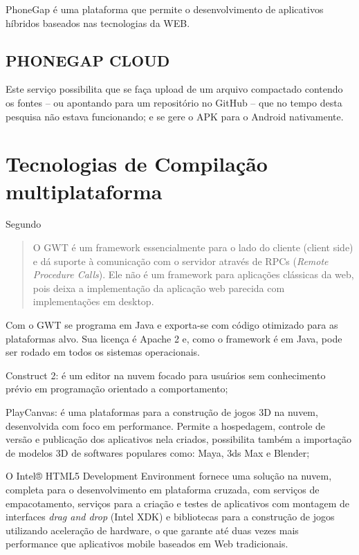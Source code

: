 PhoneGap é uma plataforma que permite o desenvolvimento de aplicativos híbridos baseados nas tecnologias da WEB.

\section{PHONEGAP CLOUD}

Este serviço possibilita que se faça upload de um arquivo compactado
contendo os fontes – ou apontando para um repositório no GitHub –
que no tempo desta pesquisa não estava funcionando; e se gere o APK
para o Android nativamente.

\chapter{Tecnologias de Compilação multiplataforma}

Segundo \cite[pp. 29]{gtw}
\begin{quote}
O GWT é um framework essencialmente para o lado do cliente (client
side) e dá suporte à comunicação com o servidor através de RPCs
(\textit{Remote Procedure Calls}). Ele não é um framework para
aplicações clássicas da web, pois deixa a implementação da
aplicação web parecida com implementações em desktop.
\end{quote}

Com o GWT se programa em Java e exporta-se com código otimizado para
as plataformas alvo. Sua licença é Apache 2 e, como o framework é em Java,
pode ser rodado em todos os sistemas operacionais.

Construct 2: é um editor na nuvem focado para usuários sem
conhecimento prévio em programação orientado a comportamento;

PlayCanvas: é uma plataformas para a construção de jogos 3D
na nuvem, desenvolvida com foco em performance. Permite a hospedagem,
controle de versão e publicação dos aplicativos nela criados,
possibilita também a importação de modelos 3D de softwares populares
como: Maya, 3ds Max e Blender;

O Intel® HTML5 Development Environment  fornece uma solução na nuvem,
completa para o desenvolvimento em plataforma cruzada, com serviços de
empacotamento, serviços para a criação e testes de aplicativos com
montagem de interfaces \textit{drag and drop} (Intel XDK) e bibliotecas para a
construção de jogos utilizando aceleração de hardware, o que garante
até duas vezes mais performance que aplicativos mobile baseados em
Web tradicionais. 

